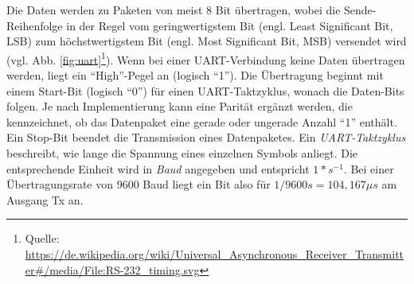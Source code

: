 Die Daten werden zu Paketen von meist 8 Bit übertragen, wobei die Sende-Reihenfolge in der Regel vom geringwertigstem Bit (engl. Least Significant Bit, LSB) zum höchstwertigstem Bit (engl. Most Significant Bit, MSB) versendet wird (vgl. Abb. \ref{fig:uart}\footnote{Quelle: \url{https://de.wikipedia.org/wiki/Universal\_Asynchronous\_Receiver\_Transmitter\#/media/File:RS-232_timing.svg}}). Wenn bei einer UART-Verbindung keine Daten übertragen werden, liegt ein ``High''-Pegel an (logisch ``1''). Die Übertragung beginnt mit einem Start-Bit (logisch ``0'') für einen UART-Taktzyklus, wonach die Daten-Bits folgen. Je nach Implementierung kann eine Parität ergänzt werden, die kennzeichnet, ob das Datenpaket eine gerade oder ungerade Anzahl ``1'' enthält. Ein Stop-Bit beendet die Transmission eines Datenpaketes. Ein \textit{UART-Taktzyklus} beschreibt, wie lange die Spannung eines einzelnen Symbols anliegt. Die entsprechende Einheit wird in \textit{Baud} angegeben und entspricht $1 * s^{-1}$. Bei einer Übertragungsrate von 9600 Baud liegt ein Bit also für $1 / 9600s = 104,167 \mu s$ am Ausgang Tx an.

